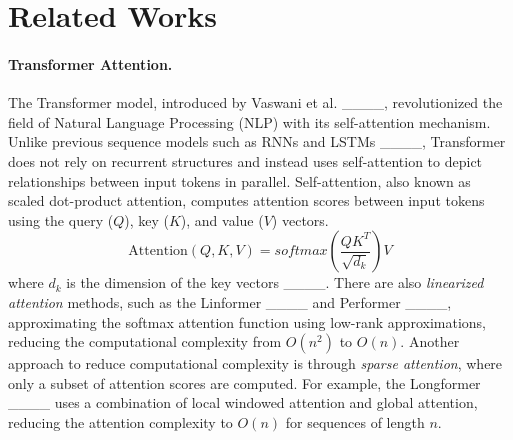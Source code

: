 \section{Related Works}
\paragraph{Transformer Attention.}
The Transformer model, introduced by Vaswani et al. ____, revolutionized the field of Natural Language Processing (NLP) with its self-attention mechanism. Unlike previous sequence models such as RNNs and LSTMs ____, Transformer does not rely on recurrent structures and instead uses self-attention to depict relationships between input tokens in parallel.
Self-attention, also known as scaled dot-product attention, computes attention scores between input tokens using the query ($Q$), key ($K$), and value ($V$) vectors. 
\[
\text{Attention}(Q, K, V) = softmax\left(\frac{QK^T}{\sqrt{d_k}}\right)V
\]
where $d_k$ is the dimension of the key vectors ____.
There are also \textit{linearized attention} methods, such as the Linformer ____ and Performer ____, approximating the softmax attention function using low-rank approximations, reducing the computational complexity from $O(n^2)$ to $O(n)$.
Another approach to reduce computational complexity is through \textit{sparse attention}, where only a subset of attention scores are computed. For example, the Longformer ____ uses a combination of local windowed attention and global attention, reducing the attention complexity to $O(n)$ for sequences of length $n$.


